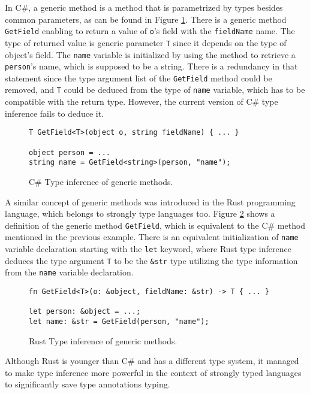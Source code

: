 In C\#, a generic method is a method that is parametrized by types besides common parameters, as can be found in Figure \ref{img03:csharp_gen_meth}.
There is a generic method \texttt{GetField} enabling to return a value of \texttt{o}'s field with the \texttt{fieldName} name.
The type of returned value is generic parameter \texttt{T} since it depends on the type of object's field.
The \texttt{name} variable is initialized by using the method to retrieve a \texttt{person}'s name, which is supposed to be a string.
There is a redundancy in that statement since the type argument list of the \texttt{GetField} method could be removed, and \texttt{T} could be deduced from the type of \texttt{name} variable, which has to be compatible with the return type.
However, the current version of C\# type inference fails to deduce it.
\begin{figure}
\begin{lstlisting}[style=csharp]
T GetField<T>(object o, string fieldName) { ... }

object person = ...
string name = GetField<string>(person, "name");
\end{lstlisting}
\caption{C\# Type inference of generic methods.}
\label{img03:csharp_gen_meth}
\end{figure}
\par
A similar concept of generic methods was introduced in the Rust \cite{online:rust} programming language, which belongs to strongly type languages too.
Figure \ref{img04:rust_gen_meth} shows a definition of the generic method \texttt{GetField}, which is equivalent to the C\# method mentioned in the previous example.
There is an equivalent initialization of \texttt{name} variable declaration starting with the \texttt{let} keyword, where Rust type inference deduces the type argument \texttt{T} to be the \texttt{\&str} type utilizing the type information from the \texttt{name} variable declaration.
\begin{figure}[h]
\begin{lstlisting}[style=csharp]
fn GetField<T>(o: &object, fieldName: &str) -> T { ... }

let person: &object = ...;
let name: &str = GetField(person, "name");
\end{lstlisting}
\caption{Rust Type inference of generic methods.}
\label{img04:rust_gen_meth}
\end{figure}
\par
Although Rust is younger than C\# and has a different type system, it managed to make type inference more powerful in the context of strongly typed languages to significantly save type annotations typing.
